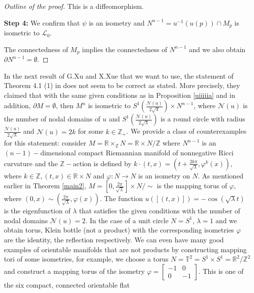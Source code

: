 \documentclass[11pt]{amsart}
\begin{document}
\begin{proof}[Outline of the proof]
    This is a diffeomorphism.

    \textbf{Step 4:} We confirm that $\psi$ is an isometry and $N^{n-1}=u^{-1}(u(p))\cap M_p$ is isometric to $\mathcal{L}_0$.

    The connectedness of $M_p$ implies the connectedness of $N^{n-1}$ and we also obtain $\partial N^{n-1}=\emptyset$.
\end{proof}

In the next result of G.Xu and X.Xue that we want to use, the statement of Theorem 4.1 (1) in \cite{xuxue} does not seem to be correct as stated. More precisely, they claimed that with the same given conditions as in Proposition \ref{uiiiiia} and in addition, $\partial M=\emptyset$, then $M^n$ is isometric to $S^1\left(\frac{\mathcal{N}(u)}{2\sqrt{\lambda}}\right)\times N^{n-1}$, where $\mathcal{N}(u)$ is the number of nodal domains of $u$ and $S^1\left(\frac{\mathcal{N}(u)}{2\sqrt{\lambda}}\right)$ is a round circle with radius $\frac{\mathcal{N}(u)}{2\sqrt{\lambda}}$ and $\mathcal{N}(u)=2k$ for some $k\in\mathbb{Z}_+$. We provide a class of counterexamples for this statement: consider  $M=\mathbb{R}\times_\mathbb{Z} N=\mathbb{R}\times N/\mathbb{Z}$ where $N^{n-1}$ is an $(n-1)-$dimensional compact Riemannian manifold of nonnegative Ricci curvature and the $\mathbb{Z}-$action is defined by $k\cdot (t,x)=\left(t+\frac{2k\pi}{\sqrt{\lambda}},\varphi^k(x)\right)$, where $k\in\mathbb{Z},(t,x)\in \mathbb{R}\times N$ and $\varphi:N\to N$ is an isometry on $N$. As mentioned earlier in Theorem \ref{main2}, $M=\left[0,\frac{2\pi}{\sqrt{\lambda}}\right]\times N/\sim$ is the mapping torus of $\varphi$, where $(0,x)\sim \left(\frac{2\pi}{\sqrt{\lambda}},\varphi(x)\right)$. The function $u([(t,x)])=-\cos(\sqrt{\lambda}t)$ is the eigenfunction of $\lambda$ that satisfies the given conditions with the number of nodal domains $\mathcal{N}(u)=2$. In the case of a unit circle $N=S^1$, $\lambda=1$ and we obtain torus, Klein bottle (not a product) with the corresponding isometries $\varphi$ are the identity, the reflection respectively. We can even have many good examples of orientable manifolds that are not products by constructing mapping tori of some isometries, for example, we choose a torus $N=\mathbb{T}^2=S^1\times S^1=\mathbb{R}^2/\mathbb{Z}^2$ and construct a mapping torus of the isometry $\varphi=\left[\begin{matrix}
    -1&0\\
    0&-1
\end{matrix}\right]$. This is one of the six compact, connected orientable flat
\end{document}
